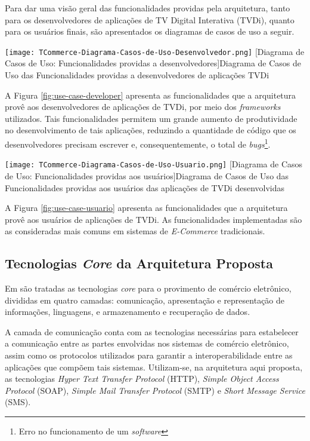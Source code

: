 Para dar uma visão geral das funcionalidades providas pela arquitetura, tanto para os desenvolvedores
de aplicações de TV Digital Interativa (TVDi), quanto para os usuários finais, são apresentados os 
diagramas de casos de uso a seguir.


\begin{center}
	\texttt{[image: TCommerce-Diagrama-Casos-de-Uso-Desenvolvedor.png]}
	[Diagrama de Casos de Uso: Funcionalidades providas a desenvolvedores]{Diagrama de Casos de Uso das Funcionalidades providas a desenvolvedores de aplicações TVDi}
	\label{fig:use-case-developer}
\end{center}

A Figura \ref{fig:use-case-developer} apresenta as funcionalidades que a arquitetura provê aos desenvolvedores
de aplicações de TVDi, por meio dos \textit{frameworks} utilizados. Tais funcionalidades permitem
um grande aumento de produtividade no desenvolvimento de tais aplicações, reduzindo a quantidade
de código que os desenvolvedores precisam escrever e, consequentemente, o total de \textit{bugs}\footnote{Erro no funcionamento de um \textit{software}}.

\begin{center}
	\texttt{[image: TCommerce-Diagrama-Casos-de-Uso-Usuario.png]}
	[Diagrama de Casos de Uso: Funcionalidades providas aos usuários]{Diagrama de Casos de Uso das Funcionalidades providas aos usuários das aplicações de TVDi desenvolvidas}
	\label{fig:use-case-usuario}
\end{center}

A Figura \ref{fig:use-case-usuario} apresenta as funcionalidades que a arquitetura provê aos usuários
de aplicações de TVDi. As funcionalidades implementadas são as consideradas mais comuns em sistemas
de \textit{E-Commerce} tradicionais.

\subsection{Tecnologias \textit{Core} da Arquitetura Proposta}

Em \cite{chu2007evolution} são tratadas as tecnologias \textit{core} para o provimento de comércio eletrônico,
divididas em quatro camadas: comunicação, apresentação e representação de informações, linguagens,
e armazenamento e recuperação de dados.

A camada de comunicação conta com as tecnologias necessárias para estabelecer a comunicação
entre as partes envolvidas nos sistemas de comércio eletrônico, assim como 
os protocolos utilizados para garantir a interoperabilidade entre as aplicações
que compõem tais sistemas. Utilizam-se, na arquitetura aqui proposta, as tecnologias
\textit{Hyper Text Transfer Protocol} (HTTP), \textit{Simple Object Access Protocol} (SOAP),
\textit{Simple Mail Transfer Protocol} (SMTP) e \textit{Short Message Service} (SMS).

